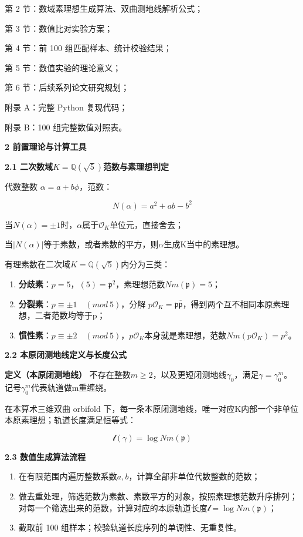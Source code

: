 \documentclass[12pt]{article}
\begin{document}
第 2 节：数域素理想生成算法、双曲测地线解析公式；

第 3 节：数值比对实验方案；

第 4 节：前 100 组匹配样本、统计校验结果；

第 5 节：数值实验的理论意义；

第 6 节：后续系列论文研究规划；

附录 A：完整 Python 复现代码；

附录 B：100 组完整数值对照表。

\textbf{2 前置理论与计算工具}

\textbf{2.1
二次数域}\(K = \mathbb{Q}\left( \sqrt{5} \right)\)\textbf{范数与素理想判定}

代数整数 \(\alpha = a + b\phi\)，范数：

\[N(\alpha) = a^{2} + ab - b^{2}\]

当\(N(\alpha) = \pm 1\)时，\(\alpha\)属于\(\mathcal{O}_{K}\)单位元，直接舍去；

当\(\left| N(\alpha) \right|\)等于素数，或者素数的平方，则\(\alpha\)生成K当中的素理想。

有理素数在二次域\(K = \mathbb{Q}\left( \sqrt{5} \right)\)内分为三类：

\begin{enumerate}
\def\labelenumi{\arabic{enumi}.}
\item
  \textbf{分歧素}：\(p = 5\)，\((5) = \mathfrak{p}^{2}\)，素理想范数\(Nm\left( \mathfrak{p} \right) = 5\)；
\item
  \textbf{分裂素}：\(p \equiv \pm 1\quad(mod\ 5)\)，分解
  \(p\mathcal{O}_{K} = \mathfrak{p}\overline{\mathfrak{p}}\)，得到两个互不相同本原素理想，二者范数均等于p；
\item
  \textbf{惯性素}：\(p \equiv \pm 2\quad(mod\ 5)\)，\(p\mathcal{O}_{K}\)本身就是素理想，范数\(Nm\left( p\mathcal{O}_{K} \right) = p^{2}\)。
\end{enumerate}

\textbf{2.2 本原闭测地线定义与长度公式}

\textbf{定义（本原闭测地线）}
不存在整数\(m \geq 2\)，以及更短闭测地线\(\gamma_{0}\)，满足\(\gamma = \gamma_{0}^{m}\)。记号\(\gamma_{0}^{m}\)代表轨道做m重缠绕。

在本算术三维双曲 orbifold
下，每一条本原闭测地线，唯一对应K内部一个非单位本原素理想；轨道长度满足恒等式：

\[\mathcal{l}(\gamma) = \log Nm\left( \mathfrak{p} \right)\]

\textbf{2.3 数值生成算法流程}

\begin{enumerate}
\def\labelenumi{\arabic{enumi}.}
\item
  在有限范围内遍历整数系数\(a,b\)，计算全部非单位代数整数的范数；
\item
  做去重处理，筛选范数为素数、素数平方的对象，按照素理想范数升序排列；对每一个筛选出来的范数，计算对应的本原轨道长度\(\mathcal{l =}\log Nm\left( \mathfrak{p} \right)\)；
\item
  截取前 100 组样本；校验轨道长度序列的单调性、无重复性。
\end{enumerate}
\end{document}
